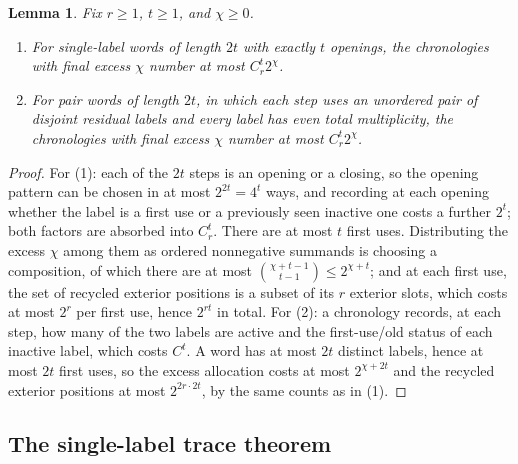 \documentclass[11pt]{article}
\newtheorem{lemma}[lemma]{Lemma}
\theoremstyle{definition}
\theoremstyle{remark}
\newcommand{\1}{\mathbf 1}
\numberwithin{equation}{section}
\begin{document}
\begin{lemma}\label{lem:chronology}
Fix $r\ge1$, $t\ge1$, and $\chi\ge0$.
\begin{enumerate}
\item For single-label words of length $2t$ with exactly $t$ openings,
the chronologies with final excess $\chi$ number at most $C_r^t2^\chi$.
\item For pair words of length $2t$, in which each step uses an
unordered pair of disjoint residual labels and every label has even
total multiplicity, the chronologies with final excess $\chi$ number at
most $C_r^t2^\chi$.
\end{enumerate}
\end{lemma}
\begin{proof}
For (1): each of the $2t$ steps is an opening or a closing, so the
opening pattern can be chosen in at most $2^{2t}=4^t$ ways, and
recording at each opening whether the label is a first use or a
previously seen inactive one costs a further $2^t$; both factors are
absorbed into $C_r^t$.  There are at most $t$ first uses.  Distributing
the excess $\chi$ among them as ordered nonnegative summands is choosing
a composition, of which there are at most
$\binom{\chi+t-1}{t-1}\le2^{\chi+t}$; and at each first use, the set of
recycled exterior positions is a subset of its $r$ exterior slots, which
costs at most $2^r$ per first use, hence $2^{rt}$ in total.
For (2): a chronology records, at each step, how many of the two
labels are active and the first-use/old
status of each inactive label, which costs $C^t$.  A word has at most
$2t$ distinct labels, hence at most $2t$ first uses, so the excess
allocation costs at most $2^{\chi+2t}$ and the recycled exterior
positions at most $2^{2r\cdot2t}$, by the same counts as in (1).
\end{proof}

\subsection{The single-label trace theorem}
\end{document}
